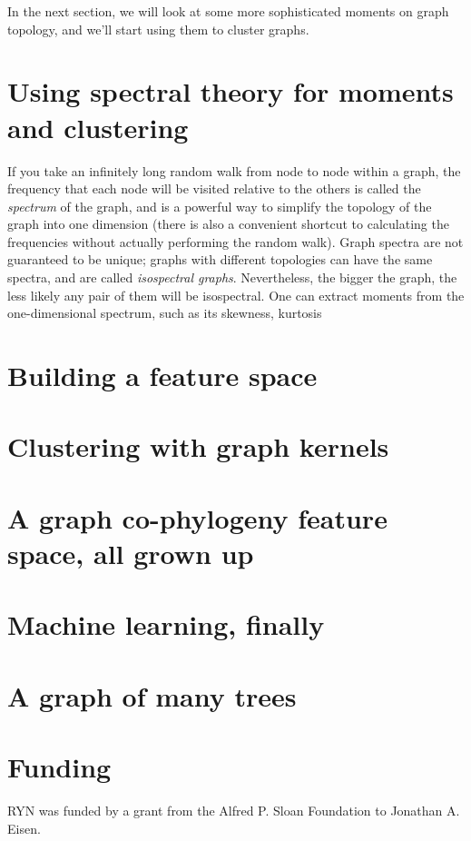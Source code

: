 \documentclass[
10pt, %
a4paper, %
oneside, %
headinclude,footinclude, %
BCOR5mm, %
]{scrartcl}
\begin{document}



In the next section, we will look at some more sophisticated moments on graph topology, and we'll start using them to cluster graphs.

\section{Using spectral theory for moments and clustering}


If you take an infinitely long random walk from node to node within a graph, the frequency that each node will be visited relative to the others is called the {\em spectrum} of the graph, and is a powerful way to simplify the topology of the graph into one dimension (there is also a convenient shortcut to calculating the frequencies without actually performing the random walk). Graph spectra are not guaranteed to be unique; graphs with different topologies can have the same spectra, and are called {\em isospectral graphs}. Nevertheless, the bigger the graph, the less likely any pair of them will be isospectral. One can extract moments from the one-dimensional spectrum, such as its skewness, kurtosis 

\section{Building a feature space}

\section{Clustering with graph kernels}

\section{A graph co-phylogeny feature space, all grown up}

\section{Machine learning, finally}

\section{A graph of many trees}



\section{Funding}

RYN was funded by a grant from the Alfred P. Sloan Foundation to Jonathan A. Eisen.

\printbibliography[heading=subbibliography]

\clearpage


\end{document}

